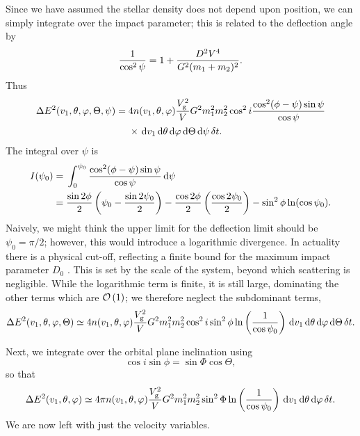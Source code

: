 Since we have assumed the stellar density does not depend upon position, we can simply integrate over the impact parameter; this is related to the deflection angle by
\begin{equation}
\dfrac{1}{\cos^2\psi} = 1 + \dfrac{D^2V^4}{G^2(m_1 + m_2)^2}.
\end{equation}
Thus
\begin{align}
\Delta E^2(v_1,\theta,\varphi,\Theta,\psi) =  {} & 4 n(v_1,\theta,\varphi)\dfrac{V_\mathrm{g}^2}{V}G^2m_1^2 m_2^2\cos^2i\dfrac{\cos^2(\phi-\psi)\sin\psi}{\cos\psi} \nonumber \\*
 {} & \times \left. \mathrm{d} v_1\,\mathrm{d}\theta\,\mathrm{d}\varphi\,\mathrm{d}\Theta\,\mathrm{d} \psi\,\delta t. \right.
\end{align}
The integral over $\psi$ is
\begin{align}
I(\psi_0) = {} & \int_{0}^{\psi_0}{\dfrac{\cos^2(\phi-\psi)\sin\psi}{\cos\psi}}\,\mathrm{d}{\psi} \nonumber \\
 = {} & \dfrac{\sin 2\phi}{2}\left(\psi_0 - \dfrac{\sin 2\psi_0}{2}\right) - \dfrac{\cos 2\phi}{2}\left(\dfrac{\cos 2\psi_0}{2}\right) - \sin^2\phi\ln(\cos\psi_0).
\end{align}
Naively, we might think the upper limit for the deflection limit should be $\psi_0 = \pi/2$; however, this would introduce a logarithmic divergence. In actuality there is a physical cut-off, reflecting a finite bound for the maximum impact parameter $D_0$ \citep{Weinberg1986}. This is set by the scale of the system, beyond which scattering is negligible. While the logarithmic term is finite, it is still large, dominating the other terms which are $\mathcal{O}\left({1}\right)$; we therefore neglect the subdominant terms,
\begin{equation}
\Delta E^2(v_1,\theta,\varphi,\Theta) \simeq  4 n(v_1,\theta,\varphi)\dfrac{V_\mathrm{g}^2}{V}G^2m_1^2 m_2^2\cos^2i\sin^2\phi\ln\left(\dfrac{1}{\cos\psi_0}\right)\,\mathrm{d} v_1\,\mathrm{d}\theta\,\mathrm{d}\varphi\,\mathrm{d}\Theta\,\delta t.
\end{equation}

Next, we integrate over the orbital plane inclination using
\begin{equation}
\cos i\sin\phi = \sin\Phi\cos\Theta,
\end{equation}
so that
\begin{equation}
\Delta E^2(v_1,\theta,\varphi) \simeq  4\pi n(v_1,\theta,\varphi)\dfrac{V_\mathrm{g}^2}{V}G^2m_1^2 m_2^2\sin^2\Phi\ln\left(\dfrac{1}{\cos\psi_0}\right)\,\mathrm{d} v_1\,\mathrm{d}\theta\,\mathrm{d}\varphi\,\delta t.
\end{equation}
We are now left with just the velocity variables.

